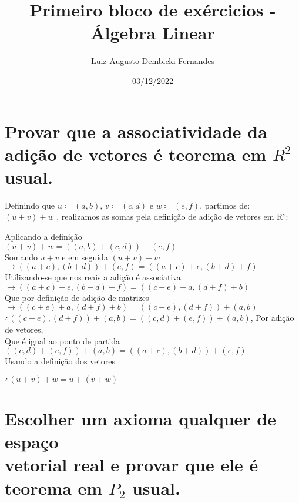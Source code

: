 \documentclass[12pt, twoside, a4]{article} %
\begin{document}
\title{Primeiro bloco de exércicios - Álgebra Linear}
\author{Luiz Augusto Dembicki Fernandes}
\date{03/12/2022}
\maketitle

\section{Provar que a associatividade da adição de vetores é teorema em $ R^2 $ usual.}

\quad    Definindo que $ u \coloneqq (a, b)$, $v  \coloneqq  (c, d)$ e $w  \coloneqq  (e, f)$, partimos de:
$ (u + v) + w $ , realizamos as somas pela definição de adição de vetores em R²:
\begin{center}
    \begin{doublespacing}
        \vspace{-1cm}
        Aplicando a definição \\ 
        $ (u + v) + w = ((a, b) + (c, d)) + (e, f)$ \\
        Somando $u + v$ e em seguida $ (u + v) + w$ \\
        $ \to ((a + c), (b + d)) + (e, f) =  ((a + c) + e, (b + d) + f)$ \\
        Utilizando-se que nos reais a adição é associativa \\
        $ \to ((a + c) + e, (b + d) + f) = ((c + e) + a, (d + f) + b)$ \\
        Que por definição de adição de matrizes \\
        $ \to  ((c + e) + a, (d + f) + b) = ((c + e), (d + f)) + (a, b)$ \\
        $ \therefore ((c + e), (d + f)) + (a, b) = ((c, d) + (e, f)) + (a, b)$, Por adição de vetores, \\
        Que é igual ao ponto de partida \\
        $ ((c, d) + (e, f)) + (a, b) =  ((a + c), (b + d)) + (e, f)$ \\
        Usando a definição dos vetores \\
    \end{doublespacing}
    $ \therefore (u + v) + w = u + (v + w) $
\end{center}

\section{Escolher um axioma qualquer de espaço \\ vetorial real e provar que ele é teorema em $P_2$ usual.}
\end{document}
